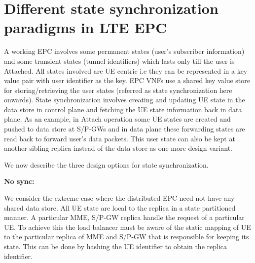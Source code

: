 \documentclass[hidelinks]{report}
\begin{document}
\section*{Different state synchronization paradigms in LTE EPC}

\par A working EPC involves some permanent states (user's subscriber information) and some transient states (tunnel identifiers) which lasts only till the user is Attached. All states involved are UE centric i.e they can be represented in a key value pair with user identifier as the key. EPC VNFs use a shared key value store  for storing/retrieving the user states (referred as state synchronization here onwards). State synchronization  involves creating and updating UE state in the data store in control plane and fetching the UE state information back in data plane. As an example, in Attach operation some UE states are created and pushed to data store at S/P-GWs and in data plane these forwarding states are read back to forward user's data packets. This user state can also be kept at another sibling replica instead of the data store as one more design variant.

\par We now describe the three design options for state synchronization. 


\noindent\textbf{No sync:}

We consider the extreme case where the distributed EPC need not have any shared data store. All UE state are local to the replica in a state partitioned manner. A particular MME, S/P-GW replica handle the request of a particular UE. To achieve this the load balancer must be aware of the static mapping of UE to the particular replica of MME and S/P-GW that is responsible for keeping its state. This can be done by hashing the UE identifier to obtain the replica identifier.
\end{document}
